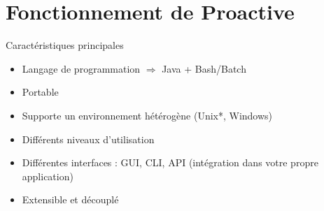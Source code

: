\documentclass{beamer}
\begin{document}
\section[Fonctionnement]{Fonctionnement de Proactive}
\begin{frame}
	\tableofcontents[currentsection]
\end{frame}
\begin{frame}{Caractéristiques principales}
    \begin{itemize}
        \item Langage de programmation $\Longrightarrow$ Java + Bash/Batch
        \item Portable
        \item Supporte un environnement hétérogène (Unix*, Windows)%
        \item Différents niveaux d'utilisation %
        \item Différentes interfaces : GUI, CLI, API (intégration dans votre propre application)
        \item Extensible et découplé
    \end{itemize}

\end{frame}
\end{document}
